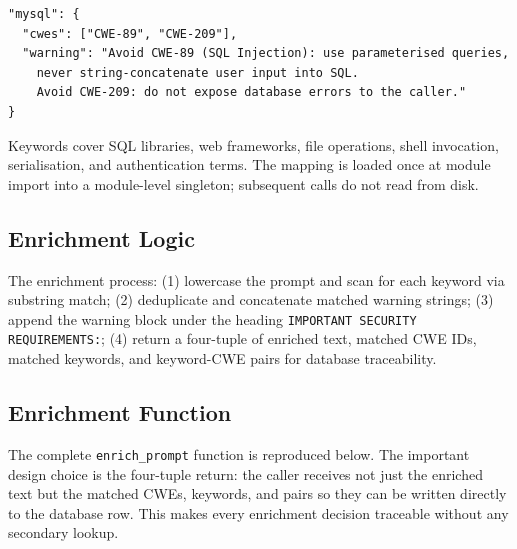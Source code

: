 \documentclass[12pt,a4paper]{report}
\begin{document}
\begin{lstlisting}[caption={Entry from \texttt{cwe\_mappings.json}},
                   label={lst:mapping}, language={}]
"mysql": {
  "cwes": ["CWE-89", "CWE-209"],
  "warning": "Avoid CWE-89 (SQL Injection): use parameterised queries,
    never string-concatenate user input into SQL.
    Avoid CWE-209: do not expose database errors to the caller."
}
\end{lstlisting}

Keywords cover SQL libraries, web frameworks, file operations, shell invocation,
serialisation, and authentication terms. The mapping is loaded once at module
import into a module-level singleton; subsequent calls do not read from disk.

\subsection{Enrichment Logic}

The enrichment process: (1) lowercase the prompt and scan for each keyword via
substring match; (2) deduplicate and concatenate matched warning strings;
(3) append the warning block under the heading \texttt{IMPORTANT SECURITY
REQUIREMENTS:}; (4) return a four-tuple of enriched text, matched CWE IDs,
matched keywords, and keyword-CWE pairs for database traceability.

\subsection{Enrichment Function}

The complete \texttt{enrich\_prompt} function is reproduced below. The important
design choice is the four-tuple return: the caller receives not just the enriched
text but the matched CWEs, keywords, and pairs so they can be written directly to
the database row. This makes every enrichment decision traceable without any
secondary lookup.
\end{document}
